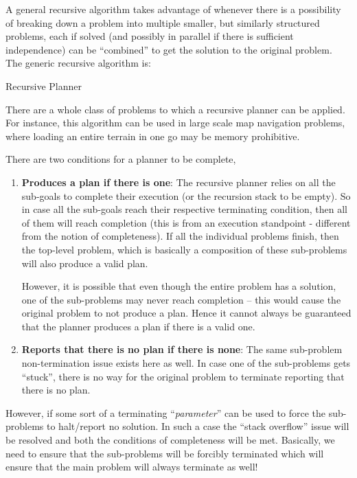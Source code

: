 \documentclass[10pt, letter]{article}
\begin{document}
A general recursive algorithm takes advantage of whenever there is a possibility of breaking down a problem into multiple smaller, but similarly structured problems, each if solved (and possibly in parallel if there is sufficient independence) can be ``combined'' to get the solution to the original problem. The generic recursive algorithm is:

\begin{algorithm}
  \caption{Recursive Planner}
  \begin{algorithmic}[1]
			\State {} 
		\EndIf
		\State {}
    \EndFunction
  \end{algorithmic}
\end{algorithm}

There are a whole class of problems to which a recursive planner can be applied. For instance, this algorithm can be used in large scale map navigation problems, where loading an entire terrain in one go may be memory prohibitive.

There are two conditions for a planner to be complete,
\begin{enumerate}
\item \textbf{Produces a plan if there is one}: The recursive planner relies on all the sub-goals to complete their execution (or the recursion stack to be empty). So in case all the sub-goals reach their respective terminating condition, then all of them will reach completion (this is from an execution standpoint - different from the notion of completeness). If all the individual problems finish, then the top-level problem, which is basically a composition of these sub-problems will also produce a valid plan.

However, it is possible that even though the entire problem has a solution, one of the sub-problems may never reach completion -- this would cause the original problem to not produce a plan. Hence it cannot always be guaranteed that the planner produces a plan if there is a valid one.

\item \textbf{Reports that there is no plan if there is none}: The same sub-problem non-termination issue exists here as well. In case one of the sub-problems gets ``stuck'', there is no way for the original problem to terminate reporting that there is no plan. 
\end{enumerate}

However, if some sort of a terminating ``\textit{parameter}'' can be used to force the sub-problems to halt/report no solution. In such a case the ``stack overflow'' issue will be resolved and both the conditions of completeness will be met. Basically, we need to ensure that the sub-problems will be forcibly terminated which will ensure that the main problem will always terminate as well!




\end{document}
